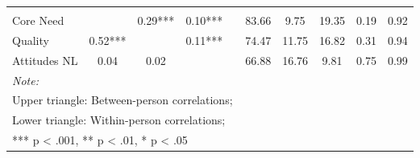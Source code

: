 \begin{table}
\begin{minipage}[t][\textheight][t]{\textwidth}
{\begin{tabular}[t]{lccccccccc}
\addlinespace[0.3em]
\multicolumn{10}{l}{\textbf{Across Studies}}\\
\hspace{1em}Core Need &  & 0.29*** & 0.10*** &  & 83.66 & 9.75 & 19.35 & 0.19 & 0.92\\
\hspace{1em}Quality & 0.52*** &  & 0.11*** &  & 74.47 & 11.75 & 16.82 & 0.31 & 0.94\\
\hspace{1em}Attitudes NL & 0.04 & 0.02 &  &  & 66.88 & 16.76 & 9.81 & 0.75 & 0.99\\
\bottomrule
\multicolumn{10}{l}{\rule{0pt}{1em}\textit{Note: }}\\
\multicolumn{10}{l}{\rule{0pt}{1em}Upper triangle: Between-person correlations;}\\
\multicolumn{10}{l}{\rule{0pt}{1em}Lower triangle: Within-person correlations;}\\
\multicolumn{10}{l}{\rule{0pt}{1em}*** p < .001, ** p < .01,  * p < .05}\\
\end{tabular}}
\end{minipage}
\end{table}
